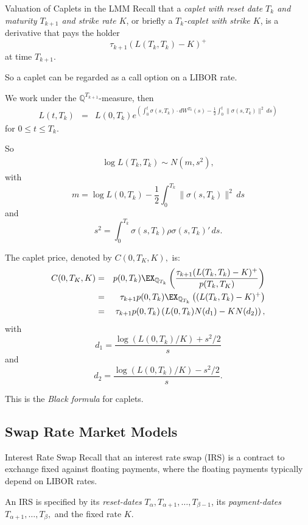 Valuation of Caplets in the LMM
	Recall that a  {\em caplet with reset date $T_k$ and maturity $T_{k+1}$ and
	strike rate $K$}, or briefly a {\em $T_k$-caplet with strike $K$},
	is a derivative  that pays the holder
		$$
		\tau_{k+1}(L(T_k,T_k)-K)^+
		$$
	at time $T_{k+1}$.
 
	So a caplet  can be regarded as a call option on a LIBOR rate.
	
	We work under the $\mathbb Q^{T_{k+1}}$-measure, then
		\begin{eqnarray*}
		L(t,T_k) & = & L(0,T_k) e^{ \left( \int_0^t \sigma(s,T_k) \cdot
		dW^{T_k}(s) - \frac{1}{2} \int^t_0 \|\sigma(s,T_k) \| ^2 \, ds
		\right)}
		\end{eqnarray*}
	for $0 \leq t \leq T_k$.

	So
		\begin{eqnarray*}
		\log L(T_k,T_k) \sim N \left( m , s^2 \right),
		\end{eqnarray*}
	with
		$$
		m= \log L(0,T_k) - \frac{1}{2} \int^{T_k}_0 \|\sigma(s,T_k) \| ^2
		\, ds
		$$
	and
		$$
		s^2=\int^{T_k}_0  \sigma(s,T_k) \rho \sigma(s,T_k)'   \, ds.
		$$

	The caplet price, denoted by $C(0,T_K,K),$ is:
		\begin{eqnarray*}
		C(0,T_K,K) & = & p(0,T_k) \EX_{\mathbb Q_{T_k}} \left(  \frac{\tau_{k+1}(L(T_k,T_k)-K)^+}{p(T_k,T_K)}  \right) \\
		& = & \tau_{k+1} p(0,T_k) \EX_{\mathbb Q_{T_k}} \left( (L(T_k,T_k)-K)^+  \right) \\
		& = & \tau_{k+1} p(0,T_k) \left( L(0,T_k) N(d_1) - K N(d_2)
		\right),
		\end{eqnarray*}
	with
		$$
		d_1 = \frac{ \log (L(0,T_k)/K) + s^2/2 }{s}
		$$
	and
		$$
		d_2 = \frac{ \log (L(0,T_k)/K) - s^2/2 }{s}.
		$$

	This is the {\em Black formula} for caplets.


\subsection{Swap Rate Market Models}

Interest Rate Swap
	Recall that an interest rate swap (IRS) is a contract to exchange fixed
	against floating payments, where the floating payments typically
	depend on LIBOR rates.
	
	An IRS is specified by its {\em
	reset-dates} $T_\alpha,T_{\alpha+1},\dots,T_{\beta-1}$, its {\em
	payment-dates} $T_{\alpha+1},\dots,T_{\beta},$ and the fixed rate $K.$
 
